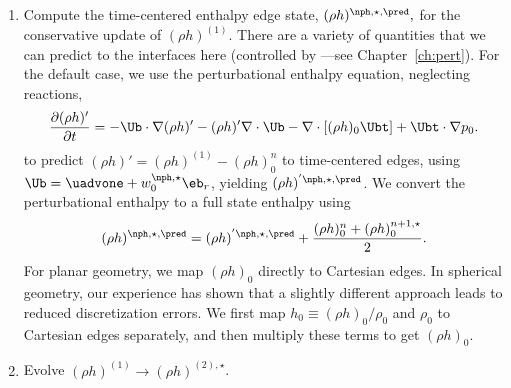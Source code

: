 \begin{description}
\begin{enumerate}
\begin{enumerate}
\renewcommand{\labelenumii}{{\bf \roman{enumii}}.}

\item Compute the time-centered enthalpy edge state, $(\rho h)^{\nph,\star,\pred},$
  for the conservative update of $(\rho h)^{(1)}$.  There are a variety
   of quantities that we can predict to the interfaces here (controlled
   by ---see Chapter~\ref{ch:pert}).  For
   the default case, we use the perturbational
  enthalpy equation, neglecting reactions,
\begin{equation}
\frac{\partial(\rho h)'}{\partial t} = -\Ub\cdot\nabla(\rho h)' - 
   (\rho h)'\nabla\cdot\Ub - \nabla\cdot\left[(\rho h)_0\Ubt\right] + \Ubt\cdot\nabla p_0 
    \label{eq:Perturbational Enthalpy}.
\end{equation}
  to predict
  $(\rho h)' = (\rho h)^{(1)} - (\rho h)_0^n$ to time-centered edges, 
  using $\Ub = \uadvone+w_0^{\nph,\star} \eb_r$,
  yielding $(\rho h)^{'\nph,\star,\pred}$.  We convert the perturbational 
  enthalpy to a full state enthalpy using
\begin{equation}
(\rho h)^{\nph,\star,\pred} = (\rho h)^{'\nph,\star,\pred} + \frac{(\rho h)_0^n + (\rho h)_0^{n+1,\star}}{2}.
\end{equation}
  For planar geometry, we map $(\rho h)_0$ directly to Cartesian edges.
  In spherical geometry, our experience has shown that a slightly different
  approach leads to reduced discretization errors.  We first map 
  $h_0 \equiv (\rho h)_0/\rho_0$ and $\rho_0$ to Cartesian edges separately, 
  and then multiply these terms to get $(\rho h)_0$.

\item Evolve $(\rho h)^{(1)} \rightarrow (\rho h)^{(2),\star}$.


\end{enumerate}
\end{enumerate}
\end{description}
